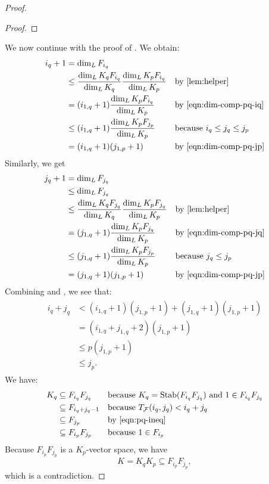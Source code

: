 \documentclass[letterpaper,10pt]{amsart}
\DeclareMathOperator{\Stab}{Stab}
\newcommand{\cF}{\mathcal{F}}
\theoremstyle{definition}
\theoremstyle{remark}
\begin{document}
\begin{proof}
\begin{proof}
\end{proof}

We now continue with the proof of . We obtain:
\begin{gather}
\label{eqn:pq-iq+1}
\begin{aligned}
i_q + 1 &= \dim_L F_{i_q} && \\
&\leq \frac{\dim_L K_q F_{i_q}}{\dim_L K_q}\frac{\dim_L K_p F_{i_q}}{\dim_L K_p } && \text{by \Cref{lem:helper}} \\
&= (i_{1,q}+1)\frac{\dim_L K_p F_{i_q}}{\dim_L K_p } && \text{by \Cref{eqn:dim-comp-pq-iq}} \\
&\leq (i_{1,q}+1)\frac{\dim_L K_p F_{j_p}}{\dim_L K_p } && \text{because $i_q \leq j_q \leq j_p$}\\
&= (i_{1,q}+1)(j_{1,p}+1) && \text{by \Cref{eqn:dim-comp-pq-jp}}
\end{aligned}
\end{gather}
Similarly, we get
\begin{gather}
\label{eqn:pq-jq+1}
\begin{aligned}
j_q + 1 &= \dim_L F_{j_q} && \\
&\leq \dim_L F_{j_q} \\
&\leq \frac{\dim_L K_q F_{j_q}}{\dim_L K_q }\frac{\dim_L K_p F_{j_q}}{\dim_L K_p } && \text{by \Cref{lem:helper}} \\
&= (j_{1,q}+1)\frac{\dim_L K_p F_{j_q}}{\dim_L K_p } &&  \text{by \Cref{eqn:dim-comp-pq-jq}} \\
&\leq (j_{1,q}+1)\frac{\dim_L K_p F_{j_p}}{\dim_L K_p } && \text{because $j_q \leq j_p$} \\
&= (j_{1,q}+1)(j_{1,p}+1) &&  \text{by \Cref{eqn:dim-comp-pq-jp}}\\
\end{aligned}
\end{gather}
Combining  and , we see that:
\begin{gather}
\label{eqn:pq-ineq}
\begin{aligned}
i_q + j_q &< (i_{1,q}+1)(j_{1,p}+1) + (j_{1,q}+1)(j_{1,p}+1) \\
		  &= (i_{1,q}+j_{1,q}+2)(j_{1,p}+1) \\
		  &\leq p(j_{1,p}+1) \\
		  &\leq j_p.
\end{aligned}
\end{gather}
We have:
\begin{align*}
K_q &\subseteq F_{i_q}F_{j_q} && \text{because $K_q = \Stab(F_{i_q}F_{j_q})$ and $1 \in F_{i_q}F_{j_q}$} \\
&\subseteq F_{i_q + j_q - 1} && \text{because $T_{\cF}(i_q,j_q) < i_q + j_q$} \\
&\subseteq F_{j_p} && \text{by \Cref{eqn:pq-ineq}} \\
&\subseteq F_{i_p}F_{j_p} && \text{because $1 \in F_{i_p}$}
\end{align*}
Because $F_{i_p}F_{j_p}$ is a $K_p$-vector space, we have
\[
	K = K_qK_p \subseteq F_{i_p}F_{j_p},
\]
which is a contradiction.
\end{proof}
\end{document}
